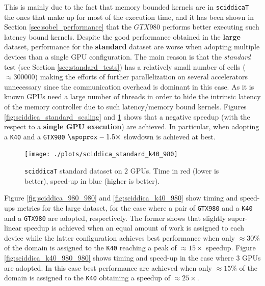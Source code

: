 This is mainly due to the fact that memory bounded kernels are in \texttt{sciddicaT} the ones that make up for most of the execution time, and it has been shown in Section \ref{sec:sobel_performance} that the $GTX980$ performs better executing such latency bound kernels.
Despite the good performance obtained in the \textbf{large} dataset, performance for the \textbf{standard} dataset are worse when adopting multiple devices than a single GPU configuration. The main reason is that the \textit{standard} test (see Section \ref{sec:standard_tests}) has a relatively small number of cells ($\approx 300000$) making the efforts of further parallelization on several accelerators unnecessary since the communication overhead is dominant in this case. As it is known GPUs need a large number of threads in order to hide the intrinsic latency of the memory controller due to such latency/memory bound kernels.
Figures \ref{fig:sciddica_standard_scaling} and \ref{fig:sciddica_standard_980_k40} shows  that a negative speedup (with the respect to a \textbf{single GPU execution}) are achieved. In particular, when adopting a \texttt{K40} and a \texttt{GTX980} $\apoprox -1.5 \times$ slowdown is achieved at best.
\begin{figure}[!htb]
	\centering
	\texttt{[image: ./plots/sciddica\_standard\_k40\_980]}
	\caption{\texttt{sciddicaT} standard dataset on $2$ GPUs. Time in red (lower is better), speed-up in blue (higher is better).}
	\label{fig:sciddica_standard_980_k40}
\end{figure}
Figure \ref{fig:sciddica_980_980} and \ref{fig:sciddica_k40_980} show timing and speed-ups metrics for the large dataset, for the case where a pair of \texttt{GTX980} and a \texttt{K40} and a \texttt{GTX980} are adopted, respectively. The former shows that slightly super-linear speedup is achieved when an equal amount of work is assigned to each device while the latter configuration achieves best performance when only $\approx 30\%$ of the domain is assigned to the \texttt{K40} reaching a peak of $\approx 15 \times$ speedup.
Figure \ref{fig:sciddica_k40_980_980} shows timing and speed-up in the case where $3$ GPUs are adopted. In this case best performance are achieved when only $\approx 15\%$ of the domain is assigned to the \texttt{K40} obtaining a speedup of  $\approx 25 \times$.

